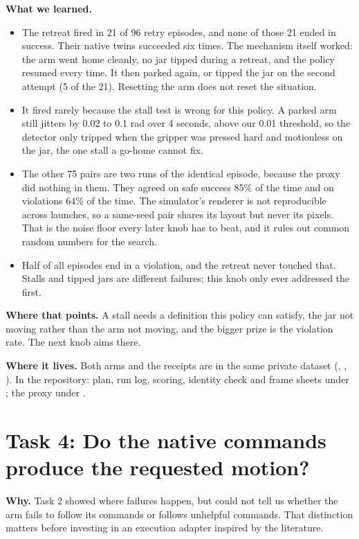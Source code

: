 \documentclass[11pt,a4paper]{article}
\begin{document}
\textbf{What we learned.}
\begin{itemize}\setlength\itemsep{1pt}
  \item The retreat fired in 21 of 96 retry episodes, and none of those 21 ended in success. Their native twins succeeded six times. The mechanism itself worked: the arm went home cleanly, no jar tipped during a retreat, and the policy resumed every time. It then parked again, or tipped the jar on the second attempt (5 of the 21). Resetting the arm does not reset the situation.
  \item It fired rarely because the stall test is wrong for this policy. A parked arm still jitters by 0.02 to 0.1 rad over 4 seconds, above our 0.01 threshold, so the detector only tripped when the gripper was pressed hard and motionless on the jar, the one stall a go-home cannot fix.
  \item The other 75 pairs are two runs of the identical episode, because the proxy did nothing in them. They agreed on safe success 85\% of the time and on violations 64\% of the time. The simulator's renderer is not reproducible across launches, so a same-seed pair shares its layout but never its pixels. That is the noise floor every later knob has to beat, and it rules out common random numbers for the search.
  \item Half of all episodes end in a violation, and the retreat never touched that. Stalls and tipped jars are different failures; this knob only ever addressed the first.
\end{itemize}

\textbf{Where that points.} A stall needs a definition this policy can satisfy, the jar not moving rather than the arm not moving, and the bigger prize is the violation rate. The next knob aims there.

\textbf{Where it lives.} Both arms and the receipts are in the same private dataset (, , ). In the repository: plan, run log, scoring, identity check and frame sheets under ; the proxy under .
\newpage
\section*{Task 4: Do the native commands produce the requested motion?}

\textbf{Why.} Task 2 showed where failures happen, but could not tell us whether the arm fails to follow its commands or follows unhelpful commands. That distinction matters before investing in an execution adapter inspired by the literature.
\end{document}
